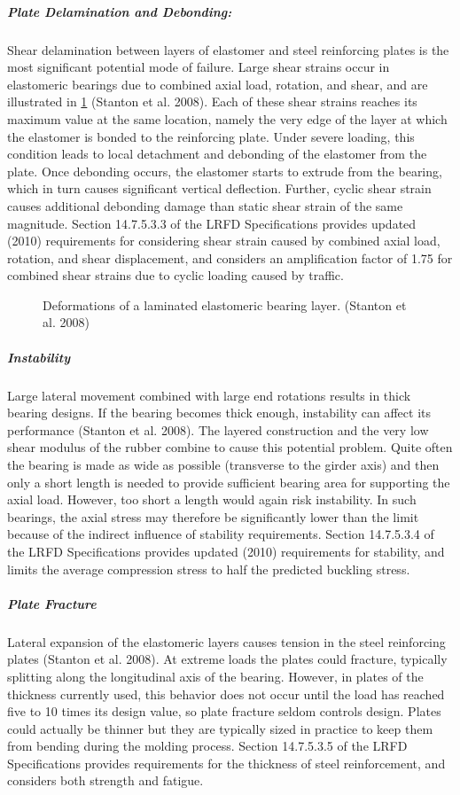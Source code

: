 \subparagraph{Plate Delamination and Debonding:}
Shear delamination between layers of elastomer and steel reinforcing plates is the most significant potential
mode of failure. Large shear strains occur in elastomeric bearings due to combined axial load, rotation, and shear, and are illustrated in \cref{fig:deformation-elastomeric-bearing} (Stanton et al. 2008). Each of these shear strains reaches its maximum value at the
same location, namely the very edge of the layer at which the elastomer is bonded to the reinforcing plate. Under
severe loading, this condition leads to local detachment and debonding of the elastomer from the plate. Once
debonding occurs, the elastomer starts to extrude from the bearing, which in turn causes significant vertical
deflection. Further, cyclic shear strain causes additional debonding damage than static shear strain of the same
magnitude. Section 14.7.5.3.3 of the LRFD Specifications provides updated (2010) requirements for considering
shear strain caused by combined axial load, rotation, and shear displacement, and considers an amplification factor of
1.75 for combined shear strains due to cyclic loading caused by traffic.

\begin{figure}
  \caption{Deformations of a laminated elastomeric bearing layer. (Stanton et al. 2008)}
  \label{fig:deformation-elastomeric-bearing}
\end{figure}

\subparagraph{Instability}
Large lateral movement combined with large end rotations results in thick bearing designs. If the bearing
becomes thick enough, instability can affect its performance (Stanton et al. 2008). The layered construction and the
very low shear modulus of the rubber combine to cause this potential problem. Quite often the bearing is made as
wide as possible (transverse to the girder axis) and then only a short length is needed to provide sufficient bearing
area for supporting the axial load. However, too short a length would again risk instability. In such bearings, the axial
stress may therefore be significantly lower than the limit because of the indirect influence of stability requirements.
Section 14.7.5.3.4 of the LRFD Specifications provides updated (2010) requirements for stability, and limits the
average compression stress to half the predicted buckling stress.

\subparagraph{Plate Fracture}

Lateral expansion of the elastomeric layers causes tension in the steel reinforcing plates (Stanton et al. 2008). At
extreme loads the plates could fracture, typically splitting along the longitudinal axis of the bearing. However, in
plates of the thickness currently used, this behavior does not occur until the load has reached five to 10 times its
design value, so plate fracture seldom controls design. Plates could actually be thinner but they are typically sized in
practice to keep them from bending during the molding process. Section 14.7.5.3.5 of the LRFD Specifications
provides requirements for the thickness of steel reinforcement, and considers both strength and fatigue.

